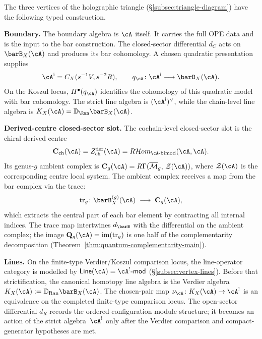 The three vertices of the holographic triangle
(\S\ref{subsec:triangle-diagram}) have the following typed
construction.

\smallskip\noindent\textbf{Boundary.}
The boundary algebra is $\cA$ itself. It carries the full
OPE data and is the input to the bar construction. The closed-sector
differential $d_C$ acts on $\barB_X(\cA)$ and produces its bar
cohomology. A chosen quadratic presentation supplies
\[
\cA^{\mathrm i}=C_X(s^{-1}V,s^{-2}R),\qquad
q_\cA\colon\cA^{\mathrm i}\longrightarrow\barB_X(\cA).
\]
On the Koszul locus, $H^\bullet(q_\cA)$ identifies the cohomology of
this quadratic model with bar cohomology. The strict line algebra is
$(\cA^{\mathrm i})^\vee$, while the chain-level line algebra is
$K_X(\cA)=\mathbb D_{\Ran}\barB_X(\cA)$.

\smallskip\noindent\textbf{Derived-centre closed-sector slot.}
The cochain-level closed-sector slot is the chiral derived centre
\[
\mathbf{C}_{\mathrm{ch}}(\cA)
=
Z^{\mathrm{der}}_{\mathrm{ch}}(\cA)
=
R\mathcal{H}om_{\cA\text{-bimod}}(\cA,\cA).
\]
Its genus-$g$ ambient complex is
$\mathbf{C}_g(\cA) = R\Gamma(\overline{\mathcal{M}}_g,\,
\mathcal{Z}(\cA))$, where
$\mathcal{Z}(\cA)$ is the corresponding centre local system. The
ambient complex receives a map from the bar complex via the trace:
\begin{equation}\label{eq:thqg-intro-bar-to-ambient}
\operatorname{tr}_{g} \colon
\barB^{(g)}_X(\cA)
\;\longrightarrow\;
\mathbf{C}_g(\cA),
\end{equation}
which extracts the central part of each bar element by contracting
all internal indices. The trace map intertwines $d_{\barB}$ with the
differential on the ambient complex; the image
$\mathbf{Q}_g(\cA) = \operatorname{im}(\operatorname{tr}_g)$ is one
half of the complementarity decomposition
(Theorem~\ref{thm:quantum-complementarity-main}).

\smallskip\noindent\textbf{Lines.}
On the finite-type Verdier/Koszul comparison locus, the line-operator
category is modelled by
$\mathsf{Line}(\cA)=\cA^!\text{-}\mathsf{mod}$
(\S\ref{subsec:vertex-lines}). Before that strictification, the
canonical homotopy line algebra is the Verdier algebra
$K_X(\cA):=\mathbb{D}_{\operatorname{Ran}}\barB_X(\cA)$.
The chosen-pair map
$\nu_{\cA}\colon K_X(\cA)\to\cA^!$ is an equivalence on the completed
finite-type comparison locus.
The open-sector differential $d_R$ records the ordered-configuration
module structure; it becomes an action of the strict algebra~$\cA^!$
only after the Verdier comparison and compact-generator hypotheses are
met.

